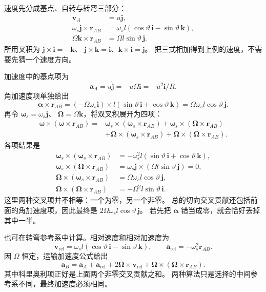 \documentclass[UTF8,zihao=-4,fontset=fandol,a4paper]{ctexart}
\newcommand{\vect}[1]{\bm{#1}}
\begin{document}
速度先分成基点、自转与转弯三部分：
\[
\begin{aligned}
\vect v_A&=u\vect j,\\
\omega_s\vect j\times\vect r_{AB}
&=\omega_s l(\cos\vartheta\,\vect i-\sin\vartheta\,\vect k),\\
\Omega\vect k\times\vect r_{AB}
&=\Omega l\sin\vartheta\,\vect j.
\end{aligned}
\]
所用叉积为 $\vect j\times\vect i=-\vect k$、
$\vect j\times\vect k=\vect i$、$\vect k\times\vect i=\vect j$。
把三式相加得到上例的速度，不需要先猜一个速度方向。

加速度中的基点项为
\[
\vect a_A=u\dot{\vect j}=-u\Omega\vect i=-u^2\vect i/R.
\]
角加速度项单独给出
\[
\vect\alpha\times\vect r_{AB}
=(-\Omega\omega_s\vect i)\times
l(\sin\vartheta\,\vect i+\cos\vartheta\,\vect k)
=\Omega\omega_s l\cos\vartheta\,\vect j.
\]
再令 $\vect\omega_s=\omega_s\vect j$、
$\vect\Omega=\Omega\vect k$，将双叉积展开为四项：
\[
\begin{aligned}
\vect\omega\times(\vect\omega\times\vect r_{AB})
={}&\vect\omega_s\times(\vect\omega_s\times\vect r_{AB})
+\vect\omega_s\times(\vect\Omega\times\vect r_{AB})\\
&+\vect\Omega\times(\vect\omega_s\times\vect r_{AB})
+\vect\Omega\times(\vect\Omega\times\vect r_{AB}).
\end{aligned}
\]
各项结果是
\[
\begin{aligned}
\vect\omega_s\times(\vect\omega_s\times\vect r_{AB})
&=-\omega_s^2l(\sin\vartheta\,\vect i+\cos\vartheta\,\vect k),\\
\vect\omega_s\times(\vect\Omega\times\vect r_{AB})
&=\omega_s\vect j\times(\Omega l\sin\vartheta\,\vect j)=0,\\
\vect\Omega\times(\vect\omega_s\times\vect r_{AB})
&=\Omega\omega_s l\cos\vartheta\,\vect j,\\
\vect\Omega\times(\vect\Omega\times\vect r_{AB})
&=-\Omega^2l\sin\vartheta\,\vect i.
\end{aligned}
\]
这里两种交叉项并不相等：一个为零，另一个非零。
总的切向交叉贡献还包括前面的角加速度项，因此最终是
$2\Omega\omega_s l\cos\vartheta\,\vect j$。
若先把 $\vect\alpha$ 错当成零，就会恰好丢掉其中一半。

也可在转弯参考系中计算。相对速度和相对加速度为
\[
\vect v_{\mathrm{rel}}=\omega_s l
(\cos\vartheta\,\vect i-\sin\vartheta\,\vect k),\qquad
\vect a_{\mathrm{rel}}=-\omega_s^2\vect r_{AB}.
\]
因 $\Omega$ 恒定，运输加速度公式给出
\[
\vect a_B=\vect a_A+\vect a_{\mathrm{rel}}
+2\vect\Omega\times\vect v_{\mathrm{rel}}
+\vect\Omega\times(\vect\Omega\times\vect r_{AB}).
\]
其中科里奥利项正好是上面两个非零交叉贡献之和。
两种算法只是选择的中间参考系不同，最终加速度必须相同。
\end{document}
